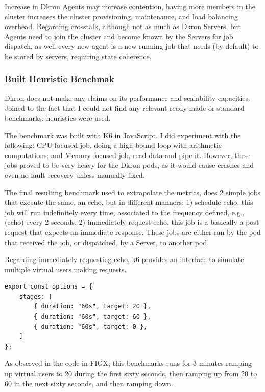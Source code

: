 \documentclass[runningheads]{llncs}
\begin{document}
Increase in Dkron Agents may increase contention, having more members in the cluster increases the cluster provisioning, maintenance,
and load balancing overhead. Regarding crosstalk, although not as much as Dkron Servers, but Agents need to join the cluster and become
known by the Servers for job dispatch, as well every new agent is a new running job that needs (by default)
to be stored by servers, requiring state coherence.

\subsubsection{Built Heuristic Benchmak}

Dkron does not make any claims on its performance and scalability capacities. Joined to the fact that
I could not find any relevant ready-made or standard benchmarks, heuristics were used.

The benchmark was built with \href{https://k6.io/docs/}{K6} in JavaScript. I did experiment with
the following: CPU-focused job, doing a high bound loop with arithmetic computations;
and Memory-focused job, read data and pipe it.
However, these jobs proved to be very heavy for the Dkron pods, as it would cause crashes and even no
fault recovery unless manually fixed.

The final resulting benchmark used to extrapolate the metrics, does 2 simple jobs
that execute the same, an echo, but in different manners: 1) schedule echo, this job will run indefinitely every time, associated to
the frequency defined, e.g., (echo) every 2 seconds.
2) immediately request echo, this job is a basically a post request that expects an immediate
response.
These jobs are either ran by the pod that received the job, or dispatched, by a Server, to another pod.

Regarding immediately requesting echo, k6 provides an interface to simulate multiple virtual users
making requests.

\begin{verbatim}
export const options = {
    stages: [
        { duration: "60s", target: 20 },
        { duration: "60s", target: 60 },
        { duration: "60s", target: 0 },
    ]
};
\end{verbatim}

As observed in the code in FIGX, this benchmarks runs for 3 minutes ramping up virtual
users to 20 during the first sixty seconds, then ramping up from 20 to 60 in the next sixty seconds,
and then ramping down.
\end{document}
